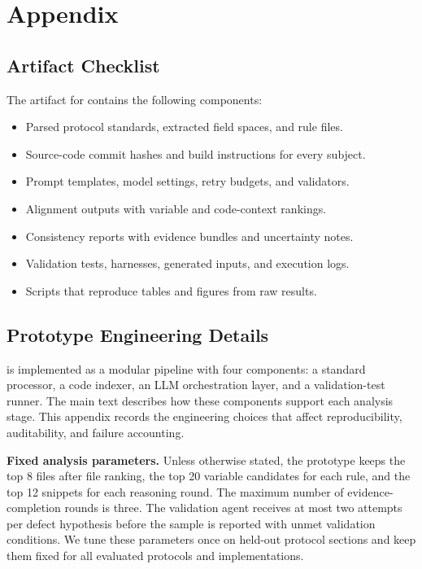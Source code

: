 \section{Appendix}
\label{sec:appendix}

\subsection{Artifact Checklist}

The artifact for \tool{} contains the following components:
\begin{itemize}[leftmargin=*]
  \item Parsed protocol standards, extracted field spaces, and rule files.
  \item Source-code commit hashes and build instructions for every subject.
  \item Prompt templates, model settings, retry budgets, and validators.
  \item Alignment outputs with variable and code-context rankings.
  \item Consistency reports with evidence bundles and uncertainty notes.
  \item Validation tests, harnesses, generated inputs, and execution logs.
  \item Scripts that reproduce tables and figures from raw results.
\end{itemize}

\subsection{Prototype Engineering Details}
\label{app:engineering}

\tool{} is implemented as a modular pipeline with four components: a standard
processor, a code indexer, an LLM orchestration layer, and a validation-test
runner. The main text describes how these components support each analysis
stage. This appendix records the engineering choices that affect
reproducibility, auditability, and failure accounting.

\textbf{Fixed analysis parameters.}
Unless otherwise stated, the prototype keeps the top 8 files after file
ranking, the top 20 variable candidates for each rule, and the top 12 snippets
for each reasoning round. The maximum number of evidence-completion rounds is
three. The validation agent receives at most two attempts per defect hypothesis
before the sample is reported with unmet validation conditions. We tune these
parameters once on held-out protocol sections and keep them fixed for all
evaluated protocols and implementations.

